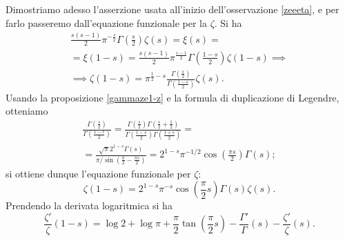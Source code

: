 Dimostriamo adesso l'asserzione usata all'inizio dell'osservazione \ref{zeeeta}, e per farlo passeremo dall'equazione funzionale per la $\zeta$. Si ha
\begin{gather*}
  \frac{s(s-1)}{2}\pi^{-\frac{s}{2}}\Gamma\left(\frac{s}{2}\right)\zeta(s)=\xi(s)= \\
  =\xi(1-s)=\frac{s(s-1)}{2}\pi^{\frac{s-1}{2}}\Gamma\left(\frac{1-s}{2}\right)\zeta(1-s) \implies \\
  \implies \zeta(1-s)=\pi^{\frac{1}{2}-s}\frac{\Gamma\left(\frac{s}{2}\right)}{\Gamma\left(\frac{1-s}{2}\right)}\zeta(s).
\end{gather*}
Usando la proposizione \ref{gammaze1-z} e la formula di duplicazione di Legendre, otteniamo
\begin{gather*}
  \frac{\Gamma\left(\frac{s}{2}\right)}{\Gamma\left(\frac{1-s}{2}\right)}=\frac{\Gamma\left(\frac{s}{2}\right)\Gamma\left(\frac{s}{2}+\frac{1}{2}\right)}{\Gamma\left(\frac{1-s}{2}\right)\Gamma\left(\frac{1+s}{2}\right)}= \\
  =\frac{\sqrt{\pi}2^{1-s}\Gamma(s)}{\pi/\sin\left(\frac{\pi}{2}-\frac{\pi s}{2}\right)}=2^{1-s}\pi^{-1/2}\cos\left(\frac{\pi s}{2}\right)\Gamma(s);
\end{gather*}
si ottiene dunque l'equazione funzionale per $\zeta$:
\begin{equation} \label{eqfunzeta}
  \zeta(1-s)=2^{1-s}\pi^{-s}\cos\left(\frac{\pi}{2}s\right)\Gamma(s)\zeta(s).
\end{equation}
Prendendo la derivata logaritmica si ha
$$\frac{\zeta'}{\zeta}(1-s)=\log{2}+\log{\pi}+\frac{\pi}{2}\tan\left(\frac{\pi}{2}s\right)-\frac{\Gamma'}{\Gamma}(s)-\frac{\zeta'}{\zeta}(s).$$
